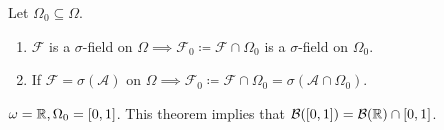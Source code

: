 \documentclass[class=article,crop=false]{standalone}
\begin{document}
\begin{thm}[10.1]
Let $ \Omega_0 \subseteq \Omega$.
\begin{enumerate}[label=(\roman*)]
	\item $ \mathcal{F}$ is a $\sigma$-field on $ \Omega \implies \mathcal{F}_0 \coloneqq \mathcal{F} \cap  \Omega_0$ is a $\sigma$-field on $ \Omega_0$.
	\item If $ \mathcal{F}= \sigma(\mathcal{A})$ on $ \Omega \implies \mathcal{F}_0 \coloneqq \mathcal{F} \cap \Omega_0 = \sigma(\mathcal{A} \cap \Omega_0)$.
\end{enumerate}
\end{thm}
\begin{eg}[]
	$ \omega = \mathbb{R}, \Omega_0 = [0,1]$. This theorem implies that $ \mathcal{B}([0,1]) = \mathcal{B}( \mathbb{R}) \cap [0,1]$.
\end{eg}
\end{document}
